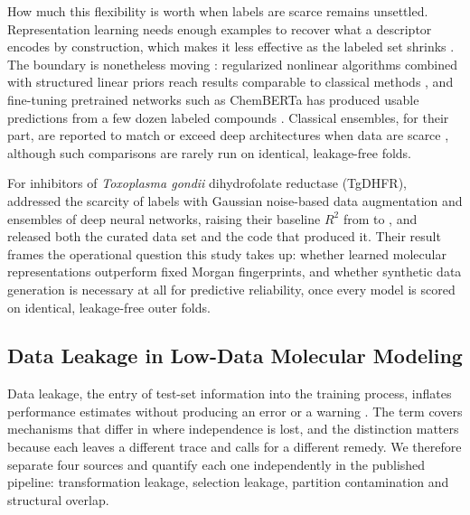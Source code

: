 How much this flexibility is worth when labels are scarce remains unsettled. Representation learning needs enough
examples to recover what a descriptor encodes by construction, which makes it less effective as the labeled set
shrinks \citep{sotirios2025}. The boundary is nonetheless moving \citep{Dalmau2025}: regularized nonlinear algorithms
combined with structured linear priors reach results comparable to classical methods \citep{Dalmau2025, salman2023},
and fine-tuning pretrained networks such as ChemBERTa has produced usable predictions from a few dozen labeled
compounds \citep{latefa2025, samuel2023}. Classical ensembles, for their part, are reported to match or exceed deep
architectures when data are scarce \citep{beatrice2026, hadas2023, rajesh2026, salman2023, samuel2023, xiewt2023},
although such comparisons are rarely run on identical, leakage-free folds.

For inhibitors of \textit{Toxoplasma gondii} dihydrofolate reductase (TgDHFR), \citet{karimova2025} addressed the
scarcity of labels with Gaussian noise-based data augmentation and ensembles of deep neural networks, raising their
baseline $R^2$ from \PaperBaselineRTwo{} to \PaperFinalRTwo{}, and released both the curated data set and the code
that produced it. Their result frames the operational question this study takes up: whether learned molecular
representations outperform fixed Morgan fingerprints, and whether synthetic data generation is necessary at all for
predictive reliability, once every model is scored on identical, leakage-free outer folds.

\subsection{Data Leakage in Low-Data Molecular Modeling}

Data leakage, the entry of test-set information into the training process, inflates performance estimates without
producing an error or a warning \citep{brva2026, gerz2026}. The term covers mechanisms that differ in where
independence is lost, and the distinction matters because each leaves a different trace and calls for a different
remedy. We therefore separate four sources and quantify each one independently in the published pipeline:
transformation leakage, selection leakage, partition contamination and structural overlap.

